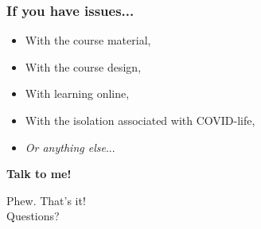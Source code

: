 \documentclass[11pt]{beamer}
\begin{document}
\begin{frame}
    \frametitle{If you have issues...}
    \begin{itemize}
        \pause \item With the course material,
        \pause \item With the course design,
        \pause \item With learning online,
        \pause \item With the isolation associated with COVID-life,
        \pause \item \emph{Or anything else}...
    \end{itemize}
    \pause \textbf{Talk to me!}
\end{frame}

  \begin{frame}[c]
  \centering
  Phew. That's it!   \\
  Questions?
  \end{frame}
  
\end{document}
